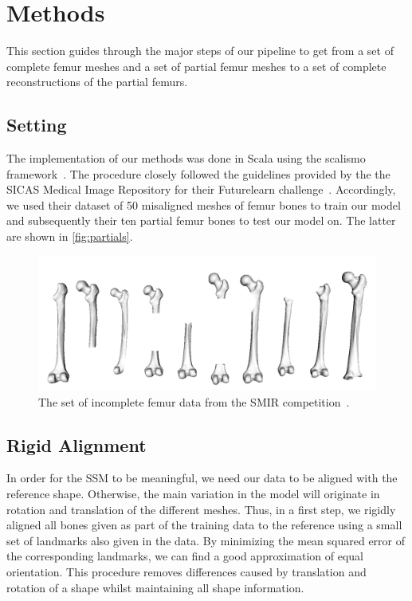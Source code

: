 \section{Methods}
\label{sec:methods}

This section guides through the major steps of our pipeline to get from a set of complete femur meshes and a set of partial femur meshes to a set of complete reconstructions of the partial femurs.


\subsection{Setting}
\label{subsec:setting}

The implementation of our methods was done in Scala using the scalismo framework~\cite{scalismo}.
The procedure closely followed the guidelines provided by the the SICAS Medical Image Repository for their Futurelearn challenge~\cite{smir}. 
Accordingly, we used their dataset of 50 misaligned meshes of femur bones to train our model and subsequently their ten partial femur bones to test our model on.
The latter are shown in \autoref{fig:partials}.

\begin{figure}
	\centering
  \includegraphics[width=.8\textwidth]{./Figures/partial_summary}
  \caption{The set of incomplete femur data from the SMIR competition~\cite{smir}.}
  \label{fig:partials}
\end{figure}


\subsection{Rigid Alignment}
\label{subsec:rigid}

In order for the SSM to be meaningful, we need our data to be aligned with the reference shape.
Otherwise, the main variation in the model will originate in rotation and translation of the different meshes.
Thus, in a first step, we rigidly aligned all bones given as part of the training data to the reference using a small set of landmarks also given in the data.
By minimizing the mean squared error of the corresponding landmarks, we can find a good approximation of equal orientation.
This procedure removes differences caused by translation and rotation of a shape whilst maintaining all shape information.

